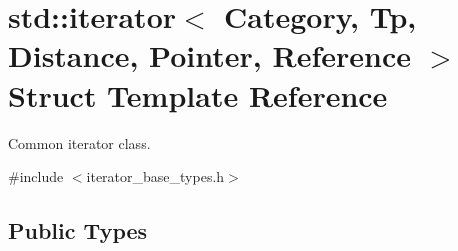 \hypertarget{structstd_1_1iterator}{}\section{std\+:\+:iterator$<$ Category, Tp, Distance, Pointer, Reference $>$ Struct Template Reference}
\label{structstd_1_1iterator}


Common iterator class.  




{\ttfamily \#include $<$iterator\+\_\+base\+\_\+types.\+h$>$}

\subsection*{Public Types}
